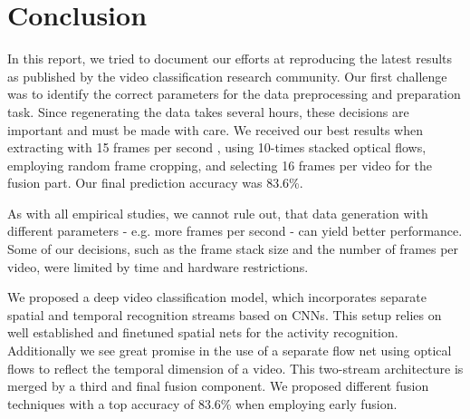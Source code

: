 \section{Conclusion}
\label{sec:conclusion}

In this report, we tried to document our efforts at reproducing the latest results as published by the video classification research community.
Our first challenge was to identify the correct parameters for the data preprocessing and preparation task.
Since regenerating the data takes several hours, these decisions are important and must be made with care.
We received our best results when extracting with 15 frames per second , using 10-times stacked optical flows, employing random frame cropping, and selecting 16 frames per video for the fusion part.
Our final prediction accuracy was 83.6\%.

As with all empirical studies, we cannot rule out, that data generation with different parameters - e.g. more frames per second - can yield better performance.
Some of our decisions, such as the frame stack size and the number of frames per video, were limited by time and hardware restrictions.

We proposed a deep video classification model, which incorporates separate spatial and temporal recognition streams based on CNNs. This setup relies on well established and finetuned spatial nets for the activity recognition. Additionally we see great promise in the use of a separate flow net using optical flows to reflect the temporal dimension of a video. This two-stream architecture is merged by a third and final fusion component. We proposed different fusion techniques with a top accuracy of 83.6\% when employing early fusion.

